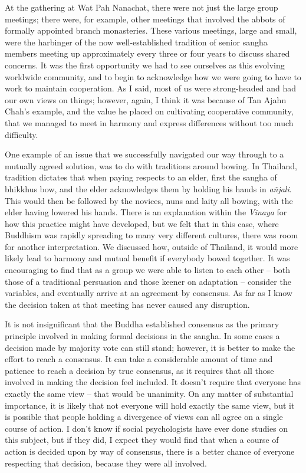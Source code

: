 At the gathering at Wat Pah Nanachat, there were not just the large
group meetings; there were, for example, other meetings that involved
the abbots of formally appointed branch monasteries. These various
meetings, large and small, were the harbinger of the now
well-established tradition of senior sangha members meeting up
approximately every three or four years to discuss shared concerns. It
was the first opportunity we had to see ourselves as this evolving
worldwide community, and to begin to acknowledge how we were going to
have to work to maintain cooperation. As I said, most of us were
strong-headed and had our own views on things; however, again, I think
it was because of Tan Ajahn Chah's example, and the value he placed on
cultivating cooperative community, that we managed to meet in harmony
and express differences without too much difficulty.

One example of an issue that we successfully navigated our way through
to a mutually agreed solution, was to do with traditions around bowing.
In Thailand, tradition dictates that when paying respects to an elder,
first the sangha of bhikkhus bow, and the elder acknowledges them by
holding his hands in \emph{añjali}. This would then be followed by the
novices, nuns and laity all bowing, with the elder having lowered his
hands. There is an explanation within the \emph{Vinaya} for how this
practice might have developed, but we felt that in this case, where
Buddhism was rapidly spreading to many very different cultures, there
was room for another interpretation. We discussed how, outside of
Thailand, it would more likely lead to harmony and mutual benefit if
everybody bowed together. It was encouraging to find that as a group we
were able to listen to each other -- both those of a traditional
persuasion and those keener on adaptation -- consider the variables, and
eventually arrive at an agreement by consensus. As far as I know the
decision taken at that meeting has never caused any disruption.

It is not insignificant that the Buddha established consensus as the
primary principle involved in making formal decisions in the sangha. In
some cases a decision made by majority vote can still stand; however, it
is better to make the effort to reach a consensus. It can take a
considerable amount of time and patience to reach a decision by true
consensus, as it requires that all those involved in making the decision
feel included. It doesn't require that everyone has exactly the same
view -- that would be unanimity. On any matter of substantial
importance, it is likely that not everyone will hold exactly the same
view, but it is possible that people holding a divergence of views can
all agree on a single course of action. I don't know if social
psychologists have ever done studies on this subject, but if they did, I
expect they would find that when a course of action is decided upon by
way of consensus, there is a better chance of everyone respecting that
decision, because they were all involved.

